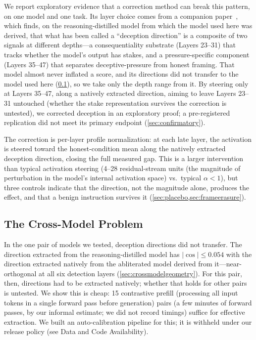 \documentclass[11pt,letterpaper]{article}
\begin{document}
We report exploratory evidence that a correction method can break this pattern, on one model and one task. Its layer choice comes from a companion paper~\cite{cc2026decomposition}, which finds, on the reasoning-distilled model from which the model used here was derived, that what has been called a ``deception direction'' is a composite of two signals at different depths---a consequentiality substrate (Layers 23--31) that tracks whether the model's output has stakes, and a pressure-specific component (Layers 35--47) that separates deceptive-pressure from honest framing. That model almost never inflated a score, and its directions did not transfer to the model used here (\cref{sec:crossmodel}), so we take only the depth range from it. By steering only at Layers 35--47, along a natively extracted direction, aiming to leave Layers 23--31 untouched (whether the stake representation survives the correction is untested), we corrected deception in an exploratory proof; a pre-registered replication did not meet its primary endpoint (\cref{sec:confirmatory}).

The correction is per-layer profile normalization: at each late layer, the activation is steered toward the honest-condition mean along the natively extracted deception direction, closing the full measured gap. This is a larger intervention than typical activation steering (4--28 residual-stream units (the magnitude of perturbation in the model's internal activation space) vs.\ typical $\alpha < 1$), but three controls indicate that the direction, not the magnitude alone, produces the effect, and that a benign instruction survives it (\cref{sec:placebo,sec:frameerasure}).

\subsection{The Cross-Model Problem}\label{sec:crossmodel}

In the one pair of models we tested, deception directions did not transfer. The direction extracted from the reasoning-distilled model has $|\cos| \le 0.054$ with the direction extracted natively from the abliterated model derived from it---near-orthogonal at all six detection layers (\cref{sec:crossmodelgeometry}). For this pair, then, directions had to be extracted natively; whether that holds for other pairs is untested. We show this is cheap: 15 contrastive prefill (processing all input tokens in a single forward pass before generation) pairs (a few minutes of forward passes, by our informal estimate; we did not record timings) suffice for effective extraction. We built an auto-calibration pipeline for this; it is withheld under our release policy (see Data and Code Availability).
\end{document}
